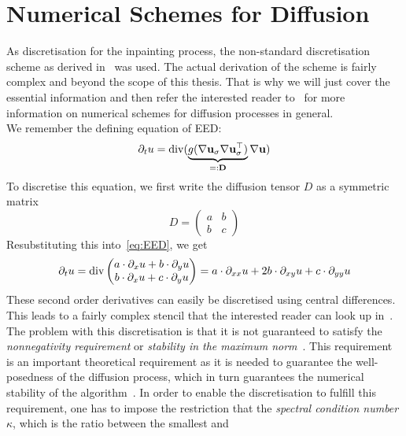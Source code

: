 \section{Numerical Schemes for Diffusion}\label{sec:NumSchemesDiffusion}
As discretisation for the inpainting process, the non-standard discretisation scheme as
derived in~\cite{www13} was used. The actual derivation of the scheme is fairly complex 
and beyond the scope of this thesis.
That is why we will just cover the essential information and then refer the interested 
reader to~\cite{weickert96, www13} for more information on numerical schemes for diffusion
processes in general.\\
We remember the defining equation of EED\@:
\begin{equation}
    \partial_t u = \operatorname{div}(\underbrace{g(\mathbf{\nabla}\mathbf{u}_\sigma\mathbf{\nabla}\mathbf{u}_\sigma^\top)}_{=:\mathbf{D}}\mathbf{\nabla}
    \mathbf{u})\label{eq:EED}
\end{equation}
To discretise this equation, we first write the diffusion tensor $D$ as a symmetric matrix
\begin{equation}
    D = \begin{pmatrix}
        a&b\\b&c
    \end{pmatrix}
\end{equation}
Resubstituting this into~\eqref{eq:EED}, we get 
\begin{equation}
\partial_t u = \operatorname{div} \begin{pmatrix}
    a\cdot \partial_x u+b\cdot \partial_y u\\
    b\cdot \partial_x u+c\cdot \partial_y u
\end{pmatrix} = a\cdot\partial_{xx} u + 2b\cdot \partial_{xy}u+ c\cdot \partial_{yy} u
\end{equation}
These second order derivatives can easily be discretised using central differences. This leads to a
fairly complex stencil that the interested reader can look up in~\cite{weickert96}.
The problem with this discretisation is that it is not guaranteed to satisfy the
\textit{nonnegativity requirement} or \textit{stability in the maximum norm}~\cite{weickert96}. This requirement is
an important theoretical requirement as it is needed to guarantee the well-posedness of the
diffusion process, which in turn guarantees the numerical stability of the
algorithm~\cite{weickert96}.
In order to enable the discretisation to fulfill this requirement, one has to impose the restriction that
the \textit{spectral condition number $\kappa$}, which is the ratio between the smallest and

